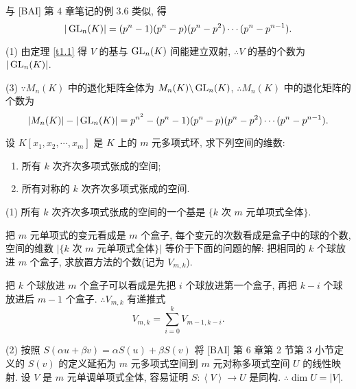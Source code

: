 \documentclass[color=black,device=normal,lang=cn,mode=geye]{elegantnote}
\begin{document}
\begin{solution}
    与 [BAI] 第 4 章笔记的例 3.6 类似, 得
    \[|\operatorname{GL}_n(K)|=(p^n-1)(p^n-p)(p^n-p^2)\cdots(p^n-p^{n-1}).\]

    (1) 由定理 \ref{t1.1} 得 $V$ 的基与 $\operatorname{GL}_n(K)$ 间能建立双射, $\therefore V$ 的基的个数为 $|\operatorname{GL}_n(K)|$.

    (3) $\because M_n(K)$ 中的退化矩阵全体为 $M_n(K)\backslash\operatorname{GL}_n(K)$, $\therefore M_n(K)$ 中的退化矩阵的个数为
    \[|M_n(K)|-|\operatorname{GL}_n(K)|=p^{n^2}-(p^n-1)(p^n-p)(p^n-p^2)\cdots(p^n-p^{n-1}).\]
\end{solution}
\begin{exercisec}[1.3.5]
    设 $K[x_1,x_2,\cdots,x_m]$ 是 $K$ 上的 $m$ 元多项式环, 求下列空间的维数:
    \begin{enumerate}
        \def\labelenumi{(\arabic{enumi})}
        \item 所有 $k$ 次齐次多项式张成的空间;
        \item 所有对称的 $k$ 次齐次多项式张成的空间.
    \end{enumerate}
\end{exercisec}
\begin{solution}
    (1) 所有 $k$ 次齐次多项式张成的空间的一个基是 $\{k$ 次 $m$ 元单项式全体$\}$.
    
    把 $m$ 元单项式的变元看成是 $m$ 个盒子, 每个变元的次数看成是盒子中的球的个数, 空间的维数 $|\{k$ 次 $m$ 元单项式全体$\}|$ 等价于下面的问题的解: 把相同的 $k$ 个球放进 $m$ 个盒子, 求放置方法的个数(记为 $V_{m,k}$).

    把 $k$ 个球放进 $m$ 个盒子可以看成是先把 $i$ 个球放进第一个盒子, 再把 $k-i$ 个球放进后 $m-1$ 个盒子. $\therefore V_{m,k}$ 有递推式
    \[V_{m,k}=\sum\limits_{i=0}^kV_{m-1,k-i}.\]

    (2) 按照 $S(\alpha u+\beta v)=\alpha S(u)+\beta S(v)$ 将 [BAI] 第 6 章第 2 节第 3 小节定义的 $S(v)$ 的定义延拓为 $m$ 元多项式空间到 $m$ 元对称多项式空间 $U$ 的线性映射. 设 $V$ 是 $m$ 元单调单项式全体, 容易证明 $S:\left<V\right>\to U$ 是同构. $\therefore\dim U=|V|$.
\end{solution}
\end{document}
